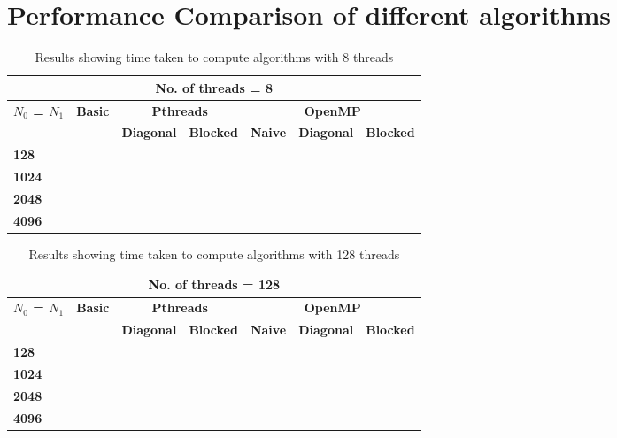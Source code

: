 \documentclass[10pt,onecolumn]{article}
\begin{document}
\section{Performance Comparison of different algorithms}
\begin{table}[H]
    \vspace{-0.5cm}
    \centering
    \caption{Results showing time taken to compute algorithms with 8 threads}
    \begin{tabular}{|l|l|l|l|l|l|l|}
    \hline
    \multicolumn{7}{|c|}{\textbf{No. of threads = 8}} \\ \hline
    \multirow{2}{*}{\textbf{$N_0$ = $N_1$}} & \multicolumn{1}{c|}{\textbf{Basic}} & \multicolumn{2}{c|}{\textbf{Pthreads}} & \multicolumn{3}{c|}{\textbf{OpenMP}} \\ \cline{2-7} 
     & \textbf{} & \textbf{Diagonal} & \textbf{Blocked} & \textbf{Naive} & \textbf{Diagonal} & \textbf{Blocked} \\ \hline
    \textbf{128} &  &  &  &  &  &  \\ \hline
    \textbf{1024} &  &  &  &  &  &  \\ \hline
    \textbf{2048} &  &  &  &  &  &  \\ \hline
    \textbf{4096} &  &  &  &  &  &  \\ \hline
    \end{tabular}
\end{table}
%
\begin{table}[H]
    \vspace{-0.5cm}
    \centering
    \caption{Results showing time taken to compute algorithms with 128 threads}
    \begin{tabular}{|l|l|l|l|l|l|l|}
    \hline
    \multicolumn{7}{|c|}{\textbf{No. of threads = 128}} \\ \hline
    \multirow{2}{*}{\textbf{$N_0$ = $N_1$}} & \multicolumn{1}{c|}{\textbf{Basic}} & \multicolumn{2}{c|}{\textbf{Pthreads}} & \multicolumn{3}{c|}{\textbf{OpenMP}} \\ \cline{2-7} 
     & \textbf{} & \textbf{Diagonal} & \textbf{Blocked} & \textbf{Naive} & \textbf{Diagonal} & \textbf{Blocked} \\ \hline
    \textbf{128} &  &  &  &  &  &  \\ \hline
    \textbf{1024} &  &  &  &  &  &  \\ \hline
    \textbf{2048} &  &  &  &  &  &  \\ \hline
    \textbf{4096} &  &  &  &  &  &  \\ \hline
    \end{tabular}
\end{table}
%
\end{document}
